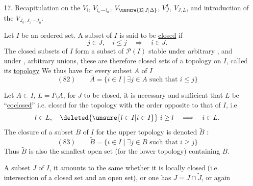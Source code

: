 
17. Recapitulation on the $V_i$, $V_{i_0\mathord{\cdot}\mathord{-}i_n}$, $V_{\unsure{\Sigma|J|\Delta}}$, $V_J^L$, $V_{J,L}$, and introduction of the $V_{J_0,J_1\mathord{\cdot}\mathord{-}J_n}$.

Let $I$ be an ordered set. A subset  of $I$ is said to be \uline{closed} if
\[j\in J,\quad i\leq j\quad\Longrightarrow\quad i\in J.\]
The closed subsets of $I$ form a  subset of $\mathcal P(I)$ stable under arbitrary , and under , arbitrary unions, these are therefore   closed sets of a topology on $I$, called its  \uline{topology}  We thus have for every subset $A$ of $I$
\[
(82)\qquad\bar A=\{i\in I\mid\exists j\in A\text{ such that }i\leq j\}
\]

 Let $A\subset I$, $L=I\setminus\bar A$, for $J$ to be closed,  it is necessary and sufficient that $L$ be ``\uline{coclosed}'' i.e. closed for the topology  with the order opposite to  that of $I$, i.e
\[l\in L,\quad\deleted{\unsure{l\in I|i\in I}}\ i\geq l\quad\Longrightarrow\quad i\in L.\]
The closure of a subset $B$ of $I$ for the upper topology is denoted $\widetilde B$ :
\[
(83)\qquad\widetilde B=\{i\in I\mid\exists j\in B\text{ such that }i\geq j\}
\]
 Thus $\widetilde B$ is also the smallest open set (for the lower topology) containing $B$.

 A subset $J$ of $I$, it amounts to the same whether it is locally closed (i.e. intersection of a closed set and an open set), or one has $J=\bar J\cap\widetilde J$, or again
